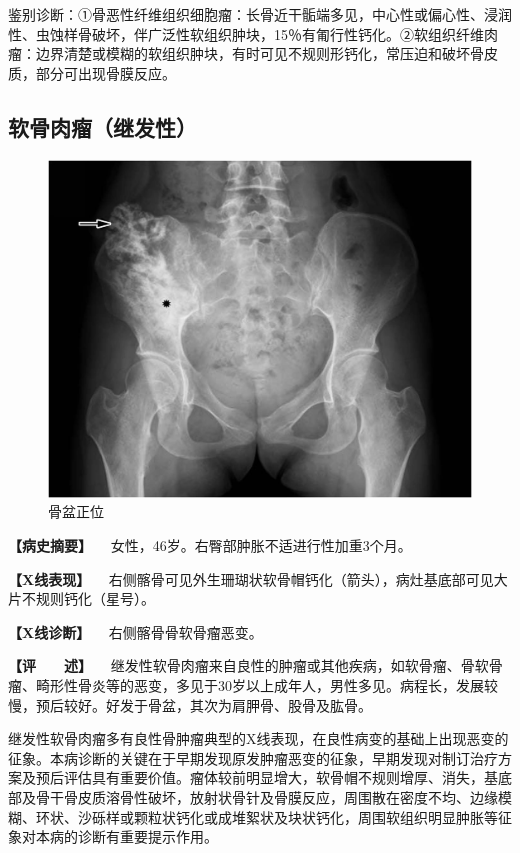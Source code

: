鉴别诊断：①骨恶性纤维组织细胞瘤：长骨近干骺端多见，中心性或偏心性、浸润性、虫蚀样骨破坏，伴广泛性软组织肿块，15％有匍行性钙化。②软组织纤维肉瘤：边界清楚或模糊的软组织肿块，有时可见不规则形钙化，常压迫和破坏骨皮质，部分可出现骨膜反应。

\subsection{软骨肉瘤（继发性）}

\begin{figure}[!htbp]
 \centering
 \includegraphics{./images/Image00102.jpg}
 \captionsetup{justification=centering}
 \caption{骨盆正位}
 \label{fig2-7-17}
  \end{figure} 

\textbf{【病史摘要】} 　女性，46岁。右臀部肿胀不适进行性加重3个月。

\textbf{【X线表现】}
　右侧髂骨可见外生珊瑚状软骨帽钙化（箭头），病灶基底部可见大片不规则钙化（星号）。

\textbf{【X线诊断】} 　右侧髂骨骨软骨瘤恶变。

\textbf{【评　　述】}
　继发性软骨肉瘤来自良性的肿瘤或其他疾病，如软骨瘤、骨软骨瘤、畸形性骨炎等的恶变，多见于30岁以上成年人，男性多见。病程长，发展较慢，预后较好。好发于骨盆，其次为肩胛骨、股骨及肱骨。

继发性软骨肉瘤多有良性骨肿瘤典型的X线表现，在良性病变的基础上出现恶变的征象。本病诊断的关键在于早期发现原发肿瘤恶变的征象，早期发现对制订治疗方案及预后评估具有重要价值。瘤体较前明显增大，软骨帽不规则增厚、消失，基底部及骨干骨皮质溶骨性破坏，放射状骨针及骨膜反应，周围散在密度不均、边缘模糊、环状、沙砾样或颗粒状钙化或成堆絮状及块状钙化，周围软组织明显肿胀等征象对本病的诊断有重要提示作用。

